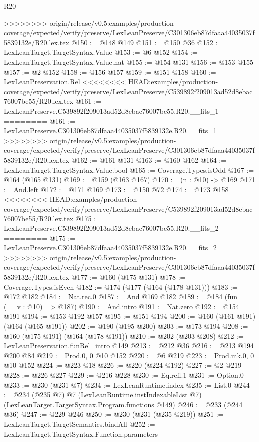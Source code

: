\begin{lexlean}{R20}
\begin{coremodule}
{{{{{{{{{{{>>>>>>>> origin/release/v0.5:examples/production-coverage/expected/verify/preserve/LexLeanPreserve/C301306eb87dfaaa44035037f5839132e/R20.lex.tex
@150 := @148 @149
@151 := @150 @36
@152 := LexLeanTarget.TargetSyntax.Value
@153 := @6 @152
@154 := LexLeanTarget.TargetSyntax.Value.nat
@155 := @154 @131
@156 := @153 @155
@157 := @2 @152
@158 := @156 @157
@159 := @151 @158
@160 := LexLeanPreservation.Rel
<<<<<<<< HEAD:examples/production-coverage/expected/verify/preserve/LexLeanPreserve/C539892f209013ad52d8ebac76007be55/R20.lex.tex
@161 := LexLeanPreserve.C539892f209013ad52d8ebac76007be55.R20.__fits_1
========
@161 := LexLeanPreserve.C301306eb87dfaaa44035037f5839132e.R20.__fits_1
>>>>>>>> origin/release/v0.5:examples/production-coverage/expected/verify/preserve/LexLeanPreserve/C301306eb87dfaaa44035037f5839132e/R20.lex.tex
@162 := @161 @131
@163 := @160 @162
@164 := LexLeanTarget.TargetSyntax.Value.bool
@165 := Coverage.Types.isOdd
@167 := @164 (@165 @131)
@169 := @159 (@163 @167)
@170 := (n : @10) -> @169
@171 := And.left
@172 := @171 @169
@173 := @150 @72
@174 := @173 @158
<<<<<<<< HEAD:examples/production-coverage/expected/verify/preserve/LexLeanPreserve/C539892f209013ad52d8ebac76007be55/R20.lex.tex
@175 := LexLeanPreserve.C539892f209013ad52d8ebac76007be55.R20.__fits_2
========
@175 := LexLeanPreserve.C301306eb87dfaaa44035037f5839132e.R20.__fits_2
>>>>>>>> origin/release/v0.5:examples/production-coverage/expected/verify/preserve/LexLeanPreserve/C301306eb87dfaaa44035037f5839132e/R20.lex.tex
@177 := @160 (@175 @131)
@178 := Coverage.Types.isEven
@182 := @174 (@177 (@164 (@178 @131)))
@183 := @172 @182
@184 := Nat.rec.{0}
@187 := And @169 @182
@189 := @184 (fun (__v : @10) => @187)
@190 := And.intro
@191 := Nat.zero
@192 := @154 @191
@194 := @153 @192 @157
@195 := @151 @194
@200 := @160 (@161 @191) (@164 (@165 @191))
@202 := @190 (@195 @200)
@203 := @173 @194
@208 := @160 (@175 @191) (@164 (@178 @191))
@210 := @202 (@203 @208)
@212 := LexLeanPreservation.funRel_intro @149
@213 := @212 @36
@216 := @213 @194 @200 @84
@219 := Prod.{0, 0} @10 @152
@220 := @6 @219
@223 := Prod.mk.{0, 0} @10 @152
@224 := @223 @18
@226 := @220 (@224 @192)
@227 := @2 @219
@228 := @226 @227
@229 := @216 @228
@230 := Eq.refl.{1}
@231 := Option.{0}
@233 := @230 (@231 @7)
@234 := LexLeanRuntime.index
@235 := List.{0}
@244 := @234
    (@235 @7)
    @7
    (LexLeanRuntime.instIndexableList @7)
    (LexLeanTarget.TargetSyntax.Program.functions @149)
@246 := @233 (@244 @36)
@247 := @229 @246
@250 := @230 (@231 (@235 @219))
@251 := LexLeanTarget.TargetSemantics.bindAll
@252 := LexLeanTarget.TargetSyntax.Function.parameters
}}}}}}}}}}}
\end{coremodule}
\end{lexlean}
